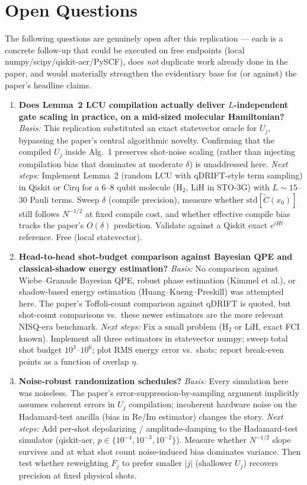 \section{Open Questions}

The following questions are genuinely open after this replication --- each is a concrete
follow-up that could be executed on free endpoints (local numpy/scipy/qiskit-aer/PySCF),
does \emph{not} duplicate work already done in the paper, and would materially strengthen
the evidentiary base for (or against) the paper's headline claims.

\begin{enumerate}
\item \textbf{Does Lemma~2 LCU compilation actually deliver $L$-independent gate scaling
  in practice, on a mid-sized molecular Hamiltonian?}
  \emph{Basis:} This replication substituted an exact statevector oracle for $U_j$,
  bypassing the paper's central algorithmic novelty. Confirming that the compiled $U_j$
  inside Alg.~1 preserves shot-noise scaling (rather than injecting compilation bias
  that dominates at moderate $\delta$) is unaddressed here.
  \emph{Next steps:} Implement Lemma~2 (random LCU with qDRIFT-style term sampling) in
  Qiskit or Cirq for a 6--8 qubit molecule (H$_2$, LiH in STO-3G) with $L\sim 15$--$30$
  Pauli terms. Sweep $\delta$ (compile precision), measure whether
  $\mathrm{std}[\tilde C(x_0)]$ still follows $N^{-1/2}$ at fixed compile cost, and
  whether effective compile bias tracks the paper's $O(\delta)$ prediction. Validate
  against a Qiskit exact $e^{iHt}$ reference. Free (local statevector).

\item \textbf{Head-to-head shot-budget comparison against Bayesian QPE and classical-shadow
  energy estimation?}
  \emph{Basis:} No comparison against Wiebe--Granade Bayesian QPE, robust phase
  estimation (Kimmel et al.), or shadow-based energy estimation (Huang--Kueng--Preskill)
  was attempted here. The paper's Toffoli-count comparison against qDRIFT is quoted, but
  shot-count comparisons vs.\ these newer estimators are the more relevant NISQ-era
  benchmark.
  \emph{Next steps:} Fix a small problem (H$_2$ or LiH, exact FCI known). Implement all
  three estimators in statevector numpy; sweep total shot budget $10^3$--$10^6$; plot RMS
  energy error vs.\ shots; report break-even points as a function of overlap $\eta$.

\item \textbf{Noise-robust randomization schedules?}
  \emph{Basis:} Every simulation here was noiseless. The paper's
  error-suppression-by-sampling argument implicitly assumes coherent errors in $U_j$
  compilation; incoherent hardware noise on the Hadamard-test ancilla (bias in Re/Im
  estimator) changes the story.
  \emph{Next steps:} Add per-shot depolarizing / amplitude-damping to the Hadamard-test
  simulator (qiskit-aer, $p\in\{10^{-4}, 10^{-3}, 10^{-2}\}$). Measure whether $N^{-1/2}$
  slope survives and at what shot count noise-induced bias dominates variance. Then test
  whether reweighting $F_j$ to prefer smaller $|j|$ (shallower $U_j$) recovers precision
  at fixed physical shots.


\end{enumerate}

